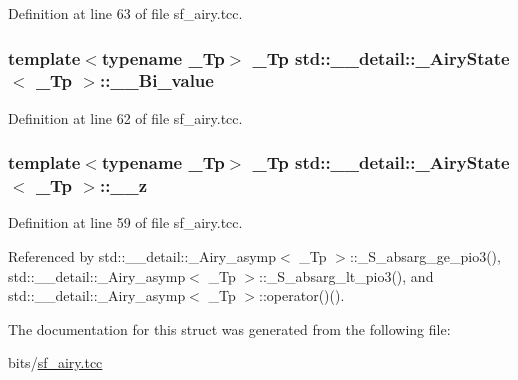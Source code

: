 Definition at line 63 of file sf\+\_\+airy.\+tcc.

\subsubsection[{\texorpdfstring{\+\_\+\+\_\+\+Bi\+\_\+value}{__Bi_value}}]{\setlength{\rightskip}{0pt plus 5cm}template$<$typename \+\_\+\+Tp$>$ \+\_\+\+Tp {\bf std\+::\+\_\+\+\_\+detail\+::\+\_\+\+Airy\+State}$<$ \+\_\+\+Tp $>$\+::\+\_\+\+\_\+\+Bi\+\_\+value}\hypertarget{structstd_1_1____detail_1_1__AiryState_a10ef7705b2b52a40502d75e62add672f}{}\label{structstd_1_1____detail_1_1__AiryState_a10ef7705b2b52a40502d75e62add672f}


Definition at line 62 of file sf\+\_\+airy.\+tcc.

\subsubsection[{\texorpdfstring{\+\_\+\+\_\+z}{__z}}]{\setlength{\rightskip}{0pt plus 5cm}template$<$typename \+\_\+\+Tp$>$ \+\_\+\+Tp {\bf std\+::\+\_\+\+\_\+detail\+::\+\_\+\+Airy\+State}$<$ \+\_\+\+Tp $>$\+::\+\_\+\+\_\+z}\hypertarget{structstd_1_1____detail_1_1__AiryState_a7606b501eba3f9b55aafa1706d7c9cc1}{}\label{structstd_1_1____detail_1_1__AiryState_a7606b501eba3f9b55aafa1706d7c9cc1}


Definition at line 59 of file sf\+\_\+airy.\+tcc.



Referenced by std\+::\+\_\+\+\_\+detail\+::\+\_\+\+Airy\+\_\+asymp$<$ \+\_\+\+Tp $>$\+::\+\_\+\+S\+\_\+absarg\+\_\+ge\+\_\+pio3(), std\+::\+\_\+\+\_\+detail\+::\+\_\+\+Airy\+\_\+asymp$<$ \+\_\+\+Tp $>$\+::\+\_\+\+S\+\_\+absarg\+\_\+lt\+\_\+pio3(), and std\+::\+\_\+\+\_\+detail\+::\+\_\+\+Airy\+\_\+asymp$<$ \+\_\+\+Tp $>$\+::operator()().



The documentation for this struct was generated from the following file\+:\begin{DoxyCompactItemize}
\item 
bits/\hyperlink{sf__airy_8tcc}{sf\+\_\+airy.\+tcc}\end{DoxyCompactItemize}
